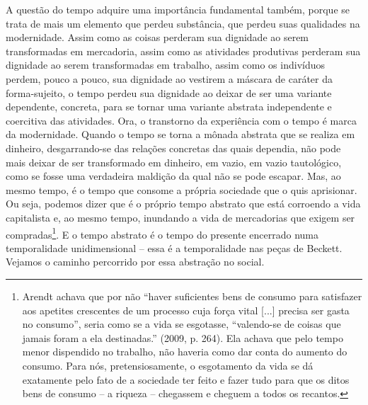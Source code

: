 A questão do tempo adquire uma importância fundamental também, porque se
trata de mais um elemento que perdeu substância, que perdeu suas
qualidades na modernidade. Assim como as coisas perderam sua dignidade
ao serem transformadas em mercadoria, assim como as atividades
produtivas perderam sua dignidade ao serem transformadas em trabalho,
assim como os indivíduos perdem, pouco a pouco, sua dignidade ao
vestirem a máscara de caráter da forma-sujeito, o tempo perdeu sua
dignidade ao deixar de ser uma variante dependente, concreta, para se
tornar uma variante abstrata independente e coercitiva das atividades.
Ora, o transtorno da experiência com o tempo é marca da modernidade.
Quando o tempo se torna a mônada abstrata que se realiza em dinheiro,
desgarrando-se das relações concretas das quais dependia, não pode mais
deixar de ser transformado em dinheiro, em vazio, em vazio tautológico,
como se fosse uma verdadeira maldição da qual não se pode escapar. Mas,
ao mesmo tempo, é o tempo que consome a própria sociedade que o quis
aprisionar. Ou seja, podemos dizer que é o próprio tempo abstrato que
está corroendo a vida capitalista e, ao mesmo tempo, inundando a vida de
mercadorias que exigem ser compradas\footnote{Arendt achava que por não
  ``haver suficientes bens de consumo para satisfazer aos apetites
  crescentes de um processo cuja força vital {[}...{]} precisa ser gasta
  no consumo'', seria como se a vida se esgotasse, ``valendo-se de
  coisas que jamais foram a ela destinadas.'' (2009, p. 264). Ela achava
  que pelo tempo menor dispendido no trabalho, não haveria como dar
  conta do aumento do consumo. Para nós, pretensiosamente, o esgotamento
  da vida se dá exatamente pelo fato de a sociedade ter feito e fazer
  tudo para que os ditos bens de consumo -- a riqueza -- chegassem e
  cheguem a todos os recantos.}. E o tempo abstrato é o tempo do
presente encerrado numa temporalidade unidimensional -- essa é a
temporalidade nas peças de Beckett. Vejamos o caminho percorrido por
essa abstração no social.

